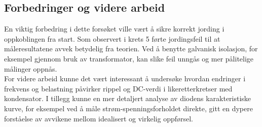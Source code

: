 \subsection{Forbedringer og videre arbeid}
En viktig forbedring i dette forsøket ville vært å sikre korrekt jording i oppkoblingen fra start. Som observert i krets 5 førte jordingsfeil til at måleresultatene avvek betydelig fra teorien. Ved å benytte galvanisk isolasjon, for eksempel gjennom bruk av transformator, kan slike feil unngås og mer pålitelige målinger oppnås.
\\[1em]
For videre arbeid kunne det vært interessant å undersøke hvordan endringer i frekvens og belastning påvirker rippel og DC-verdi i likeretterkretser med kondensator. I tillegg kunne en mer detaljert analyse av diodens karakteristiske kurve, for eksempel ved å måle strøm-spenningsforholdet direkte, gitt en dypere forståelse av avvikene mellom idealisert og virkelig oppførsel.
